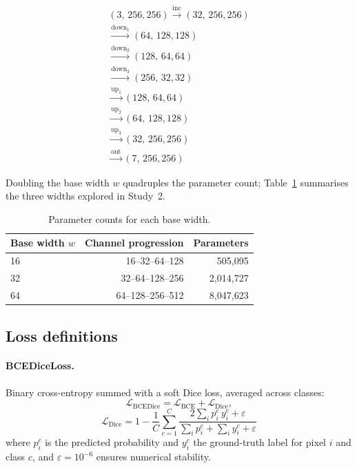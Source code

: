 \begin{appendix}
\[
\begin{array}{c}
(3,\,256,256)
\xrightarrow{\text{inc}}   (32,\,256,256)\\[2pt]
\xrightarrow{\text{down}_1}(64,\,128,128)\\[2pt]
\xrightarrow{\text{down}_2}(128,\,64,64)\\[2pt]
\xrightarrow{\text{down}_3}(256,\,32,32)\\[4pt]
\xrightarrow{\text{up}_1}  (128,\,64,64)\\[2pt]
\xrightarrow{\text{up}_2}  (64,\,128,128)\\[2pt]
\xrightarrow{\text{up}_3}  (32,\,256,256)\\[2pt]
\xrightarrow{\text{out}}   (7,\,256,256)
\end{array}
\]

\noindent
Doubling the base width $w$ quadruples the parameter count; Table~\ref{tab:bw_params} summarises the three widths explored in Study~2.

\begin{table}[htbp]
\centering
\caption{Parameter counts for each base width.}
\label{tab:bw_params}
\begin{tabular}{lrr}
\toprule
Base width $w$ & Channel progression & Parameters \\
\midrule
16 & 16--32--64--128  &    505{,}095 \\
32 & 32--64--128--256 & 2{,}014{,}727 \\
64 & 64--128--256--512 & 8{,}047{,}623 \\
\bottomrule
\end{tabular}
\end{table}

\subsection{Loss definitions}

\paragraph{BCEDiceLoss.}
Binary cross-entropy summed with a soft Dice loss, averaged across classes:
\[
\mathcal{L}_{\text{BCEDice}} = \mathcal{L}_{\text{BCE}} + \mathcal{L}_{\text{Dice}},
\]
\[
\mathcal{L}_{\text{Dice}} = 1 - \frac{1}{C}\sum_{c=1}^{C} \frac{2\sum_i p_i^c\, y_i^c + \varepsilon}{\sum_i p_i^c + \sum_i y_i^c + \varepsilon}
\]
where $p_i^c$ is the predicted probability and $y_i^c$ the ground-truth label for pixel $i$ and class $c$, and $\varepsilon=10^{-6}$ ensures numerical stability.


\end{appendix}
